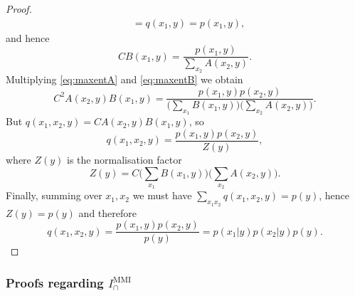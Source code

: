 \documentclass{article}
\newcommand{\IMMI}{\ensuremath{I_\cap^{\text{MMI}}}\xspace}
\begin{document}
\begin{proof}
\begin{equation}
\begin{aligned}
        & = q(x_1,y) = p(x_1,y),
    \end{aligned}
    \end{equation}
    and hence
    \begin{equation}
        CB(x_1,y) = \frac{p(x_1,y)}{\sum_{x_2} A(x_2,y)}. \label{eq:maxentB}
    \end{equation}
    Multiplying \eqref{eq:maxentA} and \eqref{eq:maxentB} we obtain
    \begin{equation}
        C^2 A(x_2,y) B(x_1,y) = \frac{p(x_1,y)p(x_2,y)}{\Big(\sum_{x_1} B(x_1,y)\Big)\Big(\sum_{x_2} A(x_2,y)\Big)}.
    \end{equation}
    But $q(x_1,x_2,y) = CA(x_2,y)B(x_1,y)$, so
    \begin{equation}
        q(x_1,x_2,y) = \frac{p(x_1,y)p(x_2,y)}{Z(y)},
    \end{equation}
    where $Z(y)$ is the normalisation factor
    \begin{equation}
        Z(y) = C\Big(\sum_{x_1} B(x_1,y)\Big)\Big(\sum_{x_2} A(x_2,y)\Big).
    \end{equation}
    Finally, summing over $x_1,x_2$ we must have $\sum_{x_1x_2} q(x_1,x_2,y) = p(y)$, hence $Z(y)=p(y)$ and therefore
    \begin{equation}
        q(x_1,x_2,y) = \frac{p(x_1,y)p(x_2,y)}{p(y)} = p(x_1|y)p(x_2|y)p(y).
    \end{equation}
\end{proof}

\subsubsection{Proofs regarding \IMMI}
\end{document}
